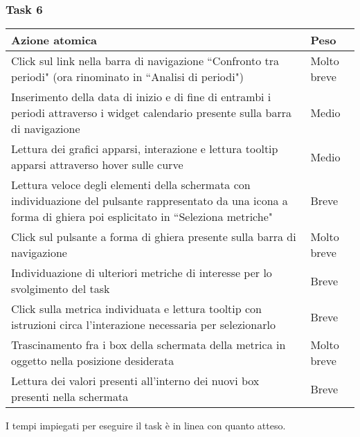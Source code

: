 \subsubsection{Task 6}
\label{sss:iaa-task-6}

{
\renewcommand{\arraystretch}{2}
\begin{longtable}[h]{| p{14cm} | p{2.5cm} |}
    \hline
    \textbf{Azione atomica} & \textbf{Peso} \\
    \hline
    \endhead
    Click sul link nella barra di navigazione ``Confronto tra periodi" (ora rinominato in ``Analisi di periodi") & Molto breve \\
    \hline
    Inserimento della data di inizio e di fine di entrambi i periodi attraverso i widget calendario presente sulla barra di navigazione & Medio \\
    \hline
    Lettura dei grafici apparsi, interazione e lettura tooltip apparsi attraverso hover sulle curve & Medio \\
    \hline
    Lettura veloce degli elementi della schermata con individuazione del pulsante rappresentato da una icona a forma di ghiera poi esplicitato in ``Seleziona metriche" & Breve \\
    \hline
    Click sul pulsante a forma di ghiera presente sulla barra di navigazione & Molto breve \\
    \hline
    Individuazione di ulteriori metriche di interesse per lo svolgimento del task & Breve \\
    \hline
    Click sulla metrica individuata e lettura tooltip con istruzioni circa l'interazione necessaria per selezionarlo & Breve \\
    \hline
    Trascinamento fra i box della schermata della metrica in oggetto nella posizione desiderata & Molto breve \\
    \hline
    Lettura dei valori presenti all'interno dei nuovi box presenti nella schermata & Breve \\
    \hline
\end{longtable}
}
I tempi impiegati per eseguire il task è in linea con quanto atteso.
